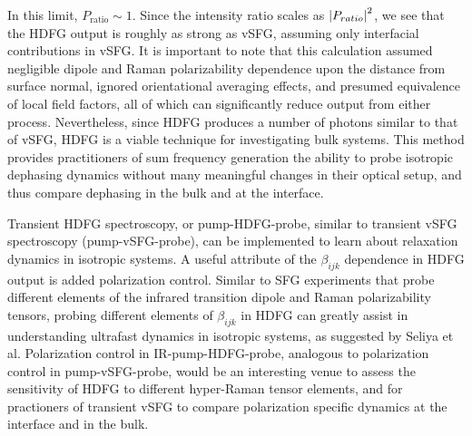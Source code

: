 \documentclass[aip, jcp, reprint, onecolumn]{revtex4-2}
\begin{document}
In this limit, $P_\text{ratio} \sim 1$.
Since the intensity ratio scales as $\abs{P_{ratio}}^2$, we see that the HDFG output is roughly as strong as vSFG, assuming only interfacial contributions in vSFG.
It is important to note that this calculation assumed negligible dipole and Raman polarizability dependence upon the distance from surface normal, ignored orientational averaging effects, and presumed equivalence of local field factors, all of which can significantly reduce output from either process. 
Nevertheless, since HDFG produces a number of photons similar to that of vSFG, HDFG is a viable technique for investigating bulk systems.
This method provides practitioners of sum frequency generation the ability to probe isotropic dephasing dynamics without many meaningful changes in their optical setup, and thus compare  dephasing in the bulk and at the interface.\cite{RN224}

Transient HDFG spectroscopy, or pump-HDFG-probe, similar to transient vSFG spectroscopy (pump-vSFG-probe), can be implemented to learn about relaxation dynamics in isotropic systems. \cite{RN224, Bonn2024}
A useful attribute of the $\beta_{ijk}$ dependence in HDFG output is added polarization control. 
Similar to SFG experiments that probe different elements of the infrared transition dipole and Raman polarizability tensors, probing different elements of $\beta_{ijk}$ in HDFG can greatly assist in understanding ultrafast dynamics in isotropic systems, as suggested by Seliya et al. \cite{Shen90, RN224, Bonn2024}
Polarization control in IR-pump-HDFG-probe, analogous to polarization control in pump-vSFG-probe, would be an interesting venue to assess the sensitivity of HDFG to different hyper-Raman tensor elements, and for practioners of transient vSFG to compare polarization specific dynamics at the interface and in the bulk. 
\end{document}
